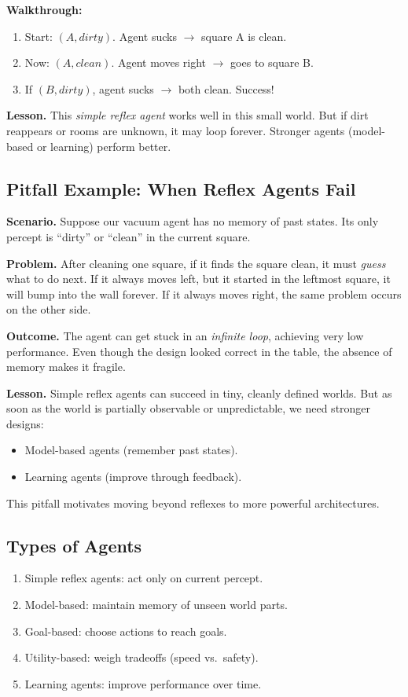 \documentclass[12pt]{article}
\theoremstyle{definition}
\begin{document}
\noindent
\textbf{Walkthrough:}
\begin{enumerate}[noitemsep]
    \item Start: $(A, dirty)$. Agent sucks $\to$ square A is clean.
    \item Now: $(A, clean)$. Agent moves right $\to$ goes to square B.
    \item If $(B, dirty)$, agent sucks $\to$ both clean. Success!
\end{enumerate}

\textbf{Lesson.} This \emph{simple reflex agent} works well in this small world.
But if dirt reappears or rooms are unknown, it may loop forever. Stronger agents
(model-based or learning) perform better.

\subsection*{Pitfall Example: When Reflex Agents Fail}
\textbf{Scenario.} Suppose our vacuum agent has no memory of past states.  
Its only percept is ``dirty'' or ``clean'' in the current square.

\medskip
\noindent
\textbf{Problem.} After cleaning one square, if it finds the square clean, it must \emph{guess} what to do next.  
If it always moves left, but it started in the leftmost square, it will bump into the wall forever.  
If it always moves right, the same problem occurs on the other side.

\medskip
\noindent
\textbf{Outcome.} The agent can get stuck in an \emph{infinite loop}, achieving very low performance.  
Even though the design looked correct in the table, the absence of memory makes it fragile.

\medskip
\noindent
\textbf{Lesson.} Simple reflex agents can succeed in tiny, cleanly defined worlds.  
But as soon as the world is partially observable or unpredictable, we need stronger designs:  
\begin{itemize}[noitemsep]
    \item Model-based agents (remember past states).  
    \item Learning agents (improve through feedback).  
\end{itemize}
This pitfall motivates moving beyond reflexes to more powerful architectures.

\subsection*{Types of Agents}
\begin{enumerate}[noitemsep]
    \item Simple reflex agents: act only on current percept.
    \item Model-based: maintain memory of unseen world parts.
    \item Goal-based: choose actions to reach goals.
    \item Utility-based: weigh tradeoffs (speed vs.\ safety).
    \item Learning agents: improve performance over time.
\end{enumerate}
\end{document}
